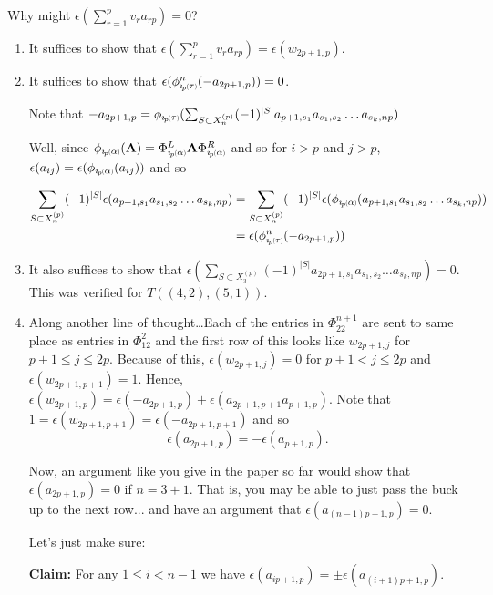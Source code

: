 \documentclass{amsart}
\newcommand*{\subsmallp}[1]{\scalebox{.5}{\ensuremath#1}}
\newcommand{\subpp}[2][p]{\imath_{\hspace*{-1pt}#1}\hspace*{-.5pt}\subsmallp(#2\subsmallp)}
\begin{document}
Why might $\epsilon(\sum_{r=1}^pv_ra_{rp}) = 0$?

\begin{enumerate}
\item It suffices to show that $\epsilon(\sum_{r=1}^pv_ra_{rp})=\epsilon(w_{2p+1,p})$.



\item It suffices to show that $\epsilon(\phi_{\subpp\tau}^n(-a_{2p+1,p}))=0$.

Note that $-a_{2p+1,p} = \phi_{\subpp\tau}(\sum_{S\subset X_n^{(p)}}(-1)^{|S|}a_{p+1,s_1}a_{s_1,s_2}\ldots a_{s_k,np})$

Well, since $\phi_{\subpp\alpha}({\bf A}) = \Phi_{\subpp\alpha}^L{\bf A}\Phi_{\subpp\alpha}^R$ and so for $i>p$ and $j>p$,
	$\epsilon(a_{ij}) = \epsilon(\phi_{\subpp\alpha}(a_{ij}))$ and so

	\begin{align*}
	\sum_{S\subset X_n^{(p)}}(-1)^{|S|}\epsilon(a_{p+1,s_1}a_{s_1,s_2}\ldots a_{s_k,np})	
				&=	\sum_{S\subset X_n^{(p)}}(-1)^{|S|}\epsilon(\phi_{\subpp\alpha}(a_{p+1,s_1}a_{s_1,s_2}\ldots a_{s_k,np}))\\
				&=	\epsilon(\phi_{\subpp\tau}^n(-a_{2p+1,p}))\\
	\end{align*}

\item It also suffices to show that $\epsilon(\sum_{S\subset X_3^{(p)}}(-1)^{|S|}a_{2p+1,s_1}a_{s_1,s_2}\ldots a_{s_k,np}) = 0$. This was verified for $T((4,2),(5,1))$.

\item Along another line of thought\ldots Each of the entries in $\Phi_{22}^{n+1}$ are sent to same place as entries in $\Phi_{12}^2$ and the first row of this looks like $w_{2p+1,j}$ for $p+1\le j\le 2p$. Because of this, $\epsilon(w_{2p+1,j}) = 0$ for $p+1<j\le 2p$ and $\epsilon(w_{2p+1,p+1}) = 1$. Hence, $\epsilon(w_{2p+1,p}) = \epsilon(-a_{2p+1,p}) + \epsilon(a_{2p+1,p+1}a_{p+1,p})$. Note that $1=\epsilon(w_{2p+1,p+1}) = \epsilon(-a_{2p+1,p+1})$ and so 
	\[\epsilon(a_{2p+1,p}) = -\epsilon(a_{p+1,p}).\]

Now, an argument like you give in the paper so far would show that $\epsilon(a_{2p+1,p})=0$ if $n=3+1$. That is, you may be able to just pass the buck up to the next row... and have an argument that $\epsilon(a_{(n-1)p+1,p}) = 0$.

Let's just make sure:

{\bf Claim:} For any $1\le i< n-1$ we have $\epsilon(a_{ip+1,p}) = \pm\epsilon(a_{(i+1)p+1,p})$.


\end{enumerate}
\end{document}

